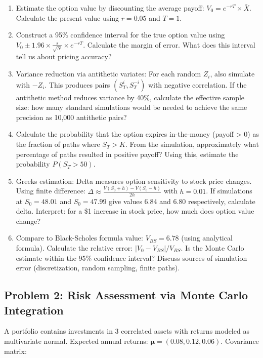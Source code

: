 \documentclass[12pt]{article}
\begin{document}
\begin{enumerate}[label=(\alph*)]
\item Estimate the option value by discounting the average payoff: $V_0 = e^{-rT} \times \bar{X}$. Calculate the present value using $r = 0.05$ and $T = 1$.

\item Construct a 95\% confidence interval for the true option value using $V_0 \pm 1.96 \times \frac{s}{\sqrt{N}} \times e^{-rT}$. Calculate the margin of error. What does this interval tell us about pricing accuracy?

\item Variance reduction via antithetic variates: For each random $Z_i$, also simulate with $-Z_i$. This produces pairs $(S_T^i, S_T^{-i})$ with negative correlation. If the antithetic method reduces variance by 40\%, calculate the effective sample size: how many standard simulations would be needed to achieve the same precision as 10,000 antithetic pairs?

\item Calculate the probability that the option expires in-the-money (payoff > 0) as the fraction of paths where $S_T > K$. From the simulation, approximately what percentage of paths resulted in positive payoff? Using this, estimate the probability $P(S_T > 50)$.

\item Greeks estimation: Delta measures option sensitivity to stock price changes. Using finite difference: $\Delta \approx \frac{V(S_0 + h) - V(S_0 - h)}{2h}$ with $h = 0.01$. If simulations at $S_0 = 48.01$ and $S_0 = 47.99$ give values 6.84 and 6.80 respectively, calculate delta. Interpret: for a \$1 increase in stock price, how much does option value change?

\item Compare to Black-Scholes formula value: $V_{BS} = 6.78$ (using analytical formula). Calculate the relative error: $|V_0 - V_{BS}|/V_{BS}$. Is the Monte Carlo estimate within the 95\% confidence interval? Discuss sources of simulation error (discretization, random sampling, finite paths).
\end{enumerate}

\subsection*{Problem 2: Risk Assessment via Monte Carlo Integration}

A portfolio contains investments in 3 correlated assets with returns modeled as multivariate normal. Expected annual returns: $\boldsymbol{\mu} = (0.08, 0.12, 0.06)$. Covariance matrix:
\end{document}
